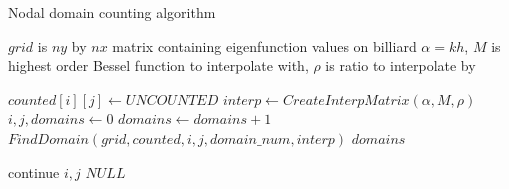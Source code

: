 \documentclass{report}
\begin{document}
\begin{algorithm}
  \caption{Nodal domain counting algorithm}
  \begin{algorithmic}
    \Require $grid$ is $ny$ by $nx$ matrix containing eigenfunction values on billiard
    \Require $\alpha = k h$, $M$ is highest order Bessel function to interpolate with, $\rho$ is ratio to interpolate by

    \item[]
                \State $counted[i][j] \gets UNCOUNTED$
            \EndFor
        \EndFor
        \State $interp \gets CreateInterpMatrix(\alpha, M, \rho)$
        \State $i,j,domains \gets 0$
            \State $domains \gets domains + 1$
            \State $FindDomain(grid, counted, i, j, domain\_num, interp)$
        \EndWhile
        \Return $domains$
    \EndFunction

    \item[]
                    \State continue
                \EndIf
                    \State \Return $i,j$
                \EndIf
            \EndFor
        \EndFor
        \State \Return $NULL$
    \EndFunction
  \end{algorithmic}
\end{algorithm}
\end{document}

